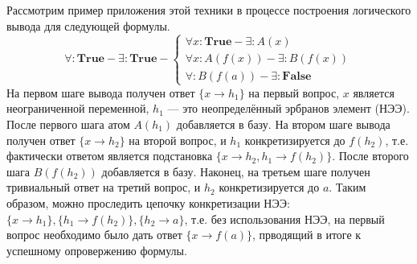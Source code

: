 Рассмотрим пример приложения этой техники в процессе построения логического вывода для следующей формулы.
\begin{equation}
	\forall\colon\boldsymbol{True} - \exists\colon\boldsymbol{True} -
	\left\lbrace
	\begin{array}{l}
		\forall x\colon\boldsymbol{True} - \exists\colon A(x) \\
		\forall x\colon A(f(x)) - \exists\colon B(f(x)) \\
		\forall\colon B(f(a)) - \exists\colon \boldsymbol{False}
	\end{array}\right.
\end{equation}
На первом шаге вывода получен ответ $\{x \rightarrow h_1\}$ на первый вопрос, $x$ является неограниченной переменной, $h_1$ --- это неопределённый эрбранов элемент (НЭЭ). После первого шага атом $A(h_1)$ добавляется в базу. На втором шаге вывода получен ответ $\{x \rightarrow h_2\}$ на второй вопрос, и $h_1$ конкретизируется до $f(h_2)$, т.е. фактически ответом является подстановка $\{x \rightarrow h_2, h_1 \rightarrow f(h_2)\}$. После второго шага $B(f(h_2))$ добавляется в базу. Наконец, на третьем шаге получен тривиальный ответ на третий вопрос, и $h_2$ конкретизируется до $a$. Таким образом, можно проследить цепочку конкретизации НЭЭ: $\{x \rightarrow h_1\}, \{h_1 \rightarrow f(h_2)\}, \{h_2 \rightarrow a\}$, т.е. без использования НЭЭ, на первый вопрос необходимо было дать ответ $\{x \rightarrow f(a)\}$, прводящий в итоге к успешному опровержению формулы.

